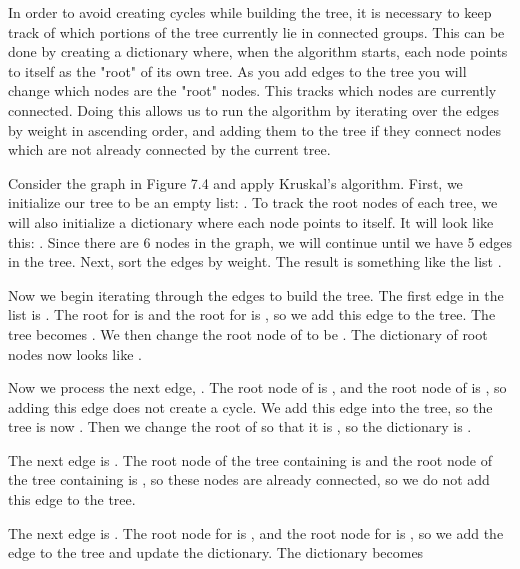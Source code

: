 In order to avoid creating cycles while building the tree, it is necessary to keep track of which portions of the tree currently lie in connected groups.
This can be done by creating a dictionary where, when the algorithm starts, each node points to itself as the "root" of its own tree.
As you add edges to the tree you will change which nodes are the "root" nodes. This tracks which nodes are currently connected.
Doing this allows us to run the algorithm by iterating over the edges by weight in ascending order, and adding them to the tree if they connect nodes which are not already connected by the current tree.

Consider the graph in Figure 7.4 and apply Kruskal's algorithm.
First, we initialize our tree to be an empty list: \li{[]}.
To track the root nodes of each tree, we will also initialize a dictionary where each node points to itself.
It will look like this: .
Since there are 6 nodes in the graph, we will continue until we have 5 edges in the tree.
Next, sort the edges by weight.
The result is something like the list \li{[(C, D, 1), (C, E, 1), (D, E, 2), (A, B, 3), (B, F, 4), (E, F, 4), (B, C, 5), (C, F, 5), (A, F, 6)]}.

Now we begin iterating through the edges to build the tree.
The first edge in the list is .
The root for  is  and the root for  is , so we add this edge to the tree.
The tree becomes \li{[(C, D, 1)]}.
We then change the root node of  to be .
The dictionary of root nodes now looks like .

Now we process the next edge, .
The root node of  is , and the root node of  is , so adding this edge does not create a cycle.
We add this edge into the tree, so the tree is now \li{[(C, D, 1), (C, E, 1)]}.
Then we change the root of  so that it is , so the dictionary is .

The next edge is .
The root node of the tree containing  is  and the root node of the tree containing  is , so these nodes are already connected, so we do not add this edge to the tree.

The next edge is .
The root node for  is , and the root node for  is , so we add the edge to the tree and update the dictionary.
The dictionary becomes 


